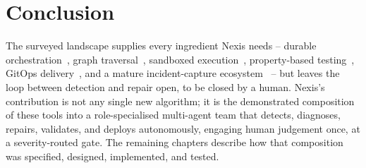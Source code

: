 \section{Conclusion}
\label{sec:lit-conclusion}

The surveyed landscape supplies every ingredient Nexis needs -- durable
orchestration~\cite{temporal}, graph traversal~\cite{neo4j}, sandboxed
execution~\cite{docker,podman}, property-based testing~\cite{hypothesis},
GitOps delivery~\cite{argocd}, and a mature incident-capture
ecosystem~\cite{sentry,datadog,pagerduty} -- but leaves the loop between
detection and repair open, to be closed by a human. Nexis's contribution is
not any single new algorithm; it is the demonstrated composition of these
tools into a role-specialised multi-agent team that detects, diagnoses,
repairs, validates, and deploys autonomously, engaging human judgement once,
at a severity-routed gate. The remaining chapters describe how that
composition was specified, designed, implemented, and tested.
